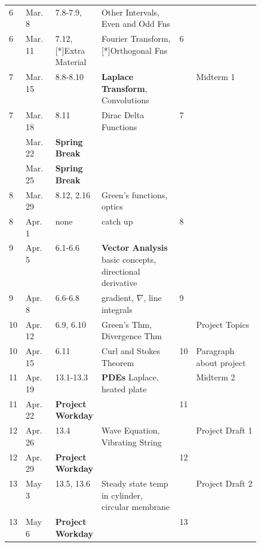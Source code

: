 \documentclass[12pt]{article}
\begin{document}
{\begin{table}[h]
\begin{tabular}{l|l|p{0.18\linewidth}|p{0.31\linewidth}|l|l}
6             & Mar. 8      & 7.8-7.9, & Other Intervals, Even and Odd Fns &  &                  \\ 
6             & Mar. 11        & 7.12, [*]Extra Material &Fourier Transform, [*]Orthogonal Fns & 6 &                 \\ \hline 
7             & Mar. 15        & 8.8-8.10 & \textbf{Laplace Transform}, Convolutions & & Midterm 1                 \\ 
7             & Mar. 18        & 8.11 & Dirac Delta Functions & 7 &                 \\ \hline 
              & Mar. 22        & \textbf{Spring Break} &  &  &                   \\ 
              & Mar. 25        & \textbf{Spring Break} &  &  &                   \\ \hline
8             & Mar. 29       & 8.12, 2.16 & Green's functions, optics  &  &                   \\ 
8             & Apr. 1      & none & catch up & 8 &                   \\ \hline 
9             & Apr. 5       & 6.1-6.6 & \textbf{Vector Analysis} basic concepts, directional derivative &  &                  \\ 
9             & Apr. 8        & 6.6-6.8 & gradient, $\nabla$, line integrals & 9 &                   \\ \hline 
10             & Apr. 12      & 6.9, 6.10 & Green's Thm, Divergence Thm &  &  Project Topics                 \\ 
10             & Apr. 15       & 6.11 & Curl and Stokes Theorem & 10 &  Paragraph about project                 \\ \hline 
11             & Apr. 19       & 13.1-13.3 & \textbf{PDEs} Laplace, heated plate &  &  Midterm 2                \\ 
11             & Apr. 22       & \textbf{Project Workday} &  & 11 &                 \\ \hline 
12            & Apr. 26      & 13.4 & Wave Equation, Vibrating String &  & Project Draft 1                 \\ 
12             & Apr. 29     & \textbf{Project Workday} &  & 12 &                 \\ \hline 
13             & May 3    & 13.5, 13.6 & Steady state temp in cylinder, circular membrane &  & Project Draft 2                 \\ 
13             & May 6       & \textbf{Project Workday} &  & 13 &                 \\ \hline 

\end{tabular}
\end{table}}
\end{document}
